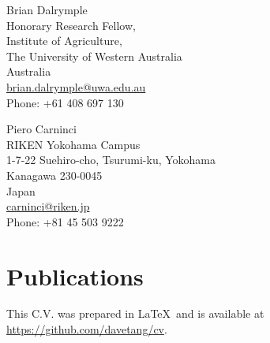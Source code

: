 \documentclass[a4paper, 10pt]{article}
\begin{document}
\begin{minipage}[ht]{.50\textwidth}
Brian Dalrymple \\
Honorary Research Fellow, \\
Institute of Agriculture, \\
The University of Western Australia \\
Australia \\
\href{mailto:brian.dalrymple@uwa.edu.au}{brian.dalrymple@uwa.edu.au} \\
Phone: +61 408 697 130
\end{minipage}
\begin{minipage}[ht]{.50\textwidth}
Piero Carninci \\
RIKEN Yokohama Campus \\
1-7-22 Suehiro-cho, Tsurumi-ku, Yokohama \\
Kanagawa 230-0045 \\
Japan \\
\href{mailto:carninci@riken.jp}{carninci@riken.jp} \\
Phone: +81 45 503 9222
\end{minipage}

\section*{Publications}
\begingroup
   \renewcommand{\section}[2]{}%
   
   \nocite{*}
   
\endgroup

\vfill

\footnotesize
This C.V. was prepared in \LaTeX\ and is available at \href{https://github.com/davetang/cv}{https://github.com/davetang/cv}.
\end{document}
